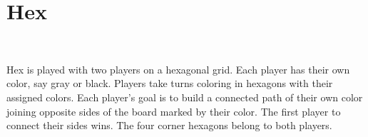 \documentclass[12pt]{article}
\begin{document}
\section*{Hex}
\begin{figure}[h]
	\centering
    \qquad
    \\
    \caption{}
\end{figure}
\noindent Hex is played with two players on a hexagonal grid. Each player has their own color, say gray or black. Players take turns coloring in hexagons with their assigned colors. Each player's goal is to build a connected path of their own color joining opposite sides of the board marked by their color. The first player to connect their sides wins. The four corner hexagons belong to both players.\\
\end{document}
